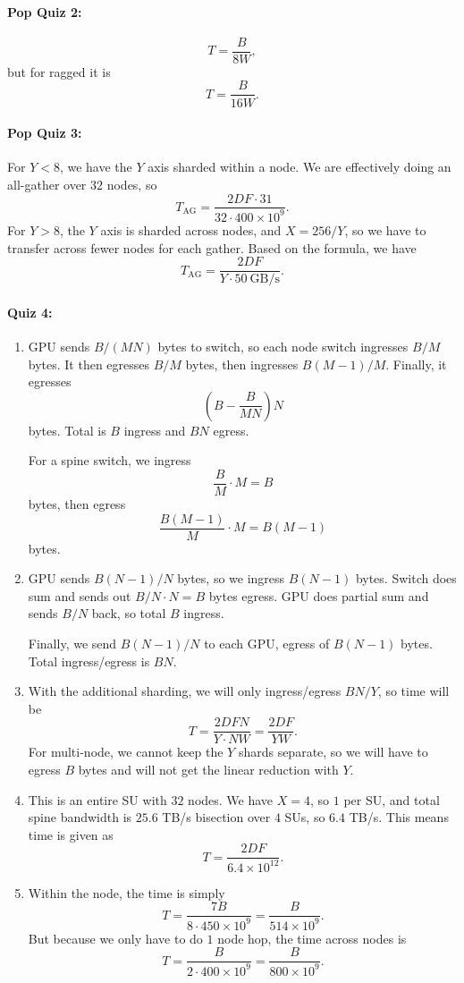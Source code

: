 \documentclass[11pt]{article}
\newcommand{\B}{B}
\newcommand{\F}{F}
\newcommand{\W}{W}
\newcommand{\quizbreak}{\Needspace{6\baselineskip}}
\begin{document}
\quizbreak
\paragraph{Pop Quiz 2:}
\[
  T=\frac{\B}{8\W},
\]
but for ragged it is
\[
  T=\frac{\B}{16\W}.
\]

\quizbreak
\paragraph{Pop Quiz 3:}
For $Y<8$, we have the $Y$ axis sharded within a node. We are effectively doing an all-gather over $32$ nodes, so
\[
  T_{\mathrm{AG}}
  =
  \frac{2D\F\cdot 31}{32\cdot 400\times 10^9}.
\]
For $Y>8$, the $Y$ axis is sharded across nodes, and $X=256/Y$, so we have to transfer across fewer nodes for each gather. Based on the formula, we have
\[
  T_{\mathrm{AG}}
  =
  \frac{2D\F}{Y\cdot 50\ \mathrm{GB/s}}.
\]

\quizbreak
\paragraph{Quiz 4:}
\begin{enumerate}
  \item GPU sends $\B/(MN)$ bytes to switch, so each node switch ingresses $\B/M$ bytes. It then egresses $\B/M$ bytes, then ingresses $\B(M-1)/M$. Finally, it egresses
  \[
    \left(\B-\frac{\B}{MN}\right)N
  \]
  bytes. Total is $\B$ ingress and $\B N$ egress.

  For a spine switch, we ingress
  \[
    \frac{\B}{M}\cdot M=\B
  \]
  bytes, then egress
  \[
    \frac{\B(M-1)}{M}\cdot M=\B(M-1)
  \]
  bytes.

  \item GPU sends $\B(N-1)/N$ bytes, so we ingress $\B(N-1)$ bytes. Switch does sum and sends out $\B/N\cdot N=\B$ bytes egress. GPU does partial sum and sends $\B/N$ back, so total $\B$ ingress.

  Finally, we send $\B(N-1)/N$ to each GPU, egress of $\B(N-1)$ bytes. Total ingress/egress is $\B N$.

  \item With the additional sharding, we will only ingress/egress $\B N/Y$, so time will be
  \[
    T
    =
    \frac{2D\F N}{Y\cdot N\W}
    =
    \frac{2D\F}{Y\W}.
  \]
  For multi-node, we cannot keep the $Y$ shards separate, so we will have to egress $\B$ bytes and will not get the linear reduction with $Y$.

  \item This is an entire SU with $32$ nodes. We have $X=4$, so $1$ per SU, and total spine bandwidth is $25.6$ TB/s bisection over $4$ SUs, so $6.4$ TB/s. This means time is given as
  \[
    T=\frac{2D\F}{6.4\times 10^{12}}.
  \]

  \item Within the node, the time is simply
  \[
    T
    =
    \frac{7\B}{8\cdot 450\times 10^9}
    =
    \frac{\B}{514\times 10^9}.
  \]
  But because we only have to do $1$ node hop, the time across nodes is
  \[
    T
    =
    \frac{\B}{2\cdot 400\times 10^9}
    =
    \frac{\B}{800\times 10^9}.
  \]
\end{enumerate}
\end{document}
